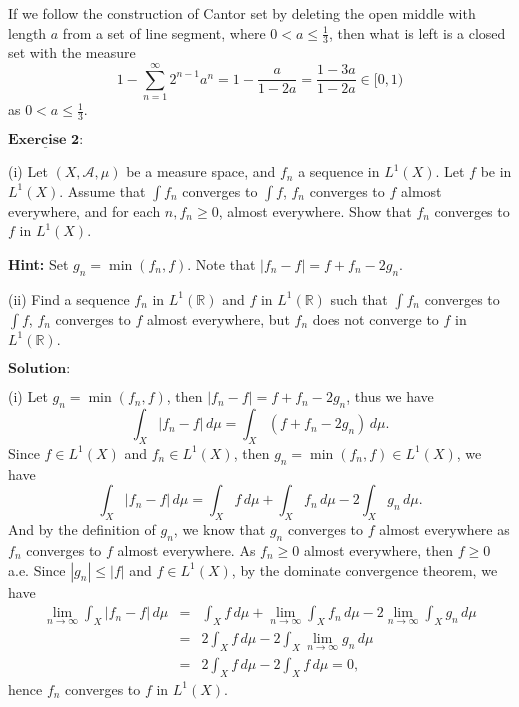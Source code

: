 \documentclass[12pt,a4paper]{ctexart}
\begin{document}
If we follow the construction of Cantor set by deleting the open middle with length $a$ from a set of line segment, where $0 < a \leq \frac{1}{3}$, then what is left is a closed set with the measure
$$1 - \sum_{n=1}^{\infty} 2^{n-1} a^n = 1 -  \frac{a}{1 - 2a} = \frac{1 - 3a}{1 - 2a} \in [0, 1) $$
as $0 < a \leq \frac{1}{3}.$


\newpage

$\underline{\textbf{Exercise 2:}}$

(i) Let $(X, \mathcal{A}, \mu)$ be a measure space, and $f_{n}$ a sequence in $L^{1}(X)$. Let $f$ be in $L^{1}(X)$. Assume that $\int f_{n}$ converges to $\int f$, $f_{n}$ converges to $f$ almost everywhere, and for each $n, f_{n} \geq 0$, almost everywhere. Show that $f_{n}$ converges to $f$ in $L^{1}(X)$.

\textbf{Hint:} Set $g_{n} = \min(f_{n}, f)$. Note that $|f_{n} - f| = f + f_{n} - 2 g_{n}$.

(ii) Find a sequence $f_{n}$ in $L^{1}(\mathbb{R})$ and $f$ in $L^{1}(\mathbb{R})$ such that $\int f_{n}$ converges to $\int f$, $f_{n}$ converges to $f$ almost everywhere, but $f_{n}$ does not converge to $f$ in $L^{1}(\mathbb{R})$.
 
\vspace{8pt}
$\textbf{Solution:}$

(i) Let $g_{n} = \min(f_{n}, f)$, then $|f_{n} - f| = f + f_{n} - 2 g_{n}$, thus we have
\begin{equation*}
    \int_{X}^{} |f_{n} - f| \, d \mu = \int_{X}^{} (f + f_{n} - 2 g_{n}) \, d \mu.
\end{equation*}
Since $f \in L^{1}(X)$ and $f_{n} \in L^{1}(X)$, then $g_{n} = \min(f_{n}, f) \in L^{1}(X)$, we have
\begin{equation*}
    \int_{X}^{} |f_{n} - f| \, d \mu = \int_{X}^{} f \, d \mu + \int_{X}^{} f_{n} \, d \mu - 2 \int_{X}^{} g_{n} \, d \mu.
\end{equation*}
And by the definition of $g_{n}$, we know that $g_{n}$ converges to $f$ almost everywhere as $f_{n}$ converges to $f$ almost everywhere. As $f_{n} \geq 0$ almost everywhere, then $f \geq 0$ a.e. Since $|g_{n}| \leq |f|$ and $f \in L^{1} (X)$, by the dominate convergence theorem, we have
\begin{eqnarray*}
    \lim_{n \to \infty} \int_{X}^{} |f_{n} - f| \, d \mu & = & \int_{X}^{} f \, d \mu + \lim_{n \to \infty}  \int_{X}^{} f_{n} \, d \mu - 2 \lim_{n \to \infty} \int_{X}^{} g_{n} \, d \mu \\
    & = & 2 \int_{X}^{} f \, d \mu - 2 \int_{X}^{} \lim_{n \to \infty} g_{n} \, d \mu \\
    & = & 2 \int_{X}^{} f \, d \mu - 2 \int_{X}^{} f \, d \mu = 0,
\end{eqnarray*}
hence $f_{n}$ converges to $f$ in $L^{1}(X)$.
\end{document}
